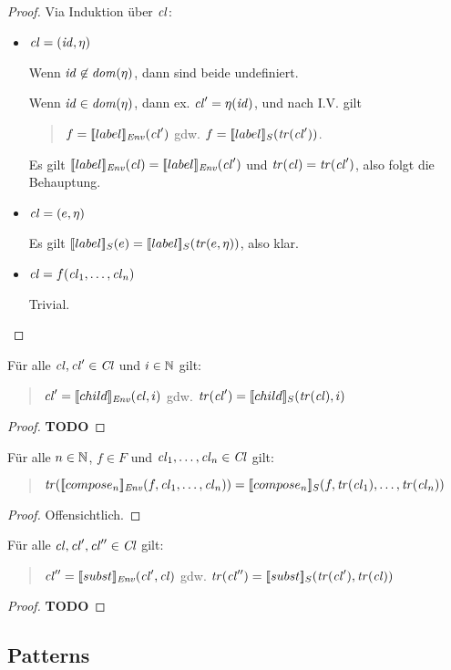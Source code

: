\documentclass[12pt,a4paper,draft]{article}
\begin{document}
\begin{proof}
  Via Induktion \"uber $\mathit{cl}$:
  \begin{itemize}
  \item $\mathit{cl} = (\mathit{id},\eta)$

    Wenn $\mathit{id} \not\in \mathit{dom}(\eta)$, dann sind beide undefiniert.

    Wenn $\mathit{id} \in \mathit{dom}(\eta)$, dann ex. $\mathit{cl}' = \eta(\mathit{id})$, und nach I.V. gilt
    \begin{quote}
      $f = [\![label]\!]_{\mathit{Env}}(\mathit{cl}')$ gdw. $f = [\![label]\!]_S(\mathit{tr}(\mathit{cl}'))$.
    \end{quote}
    Es gilt $[\![label]\!]_{\mathit{Env}}(\mathit{cl}) = [\![label]\!]_{\mathit{Env}}(\mathit{cl}')$ und
    $\mathit{tr}(\mathit{cl}) = \mathit{tr}(\mathit{cl}')$, also folgt die Behauptung.

  \item $\mathit{cl} = (e,\eta)$

    Es gilt $[\![label]\!]_S(e) = [\![label]\!]_S(\mathit{tr}(e,\eta))$, also klar.

  \item $\mathit{cl} = f(\mathit{cl}_1,\ldots,\mathit{cl}_n)$

    Trivial.

  \end{itemize}
\end{proof}

\begin{lemma}
  F\"ur alle $\mathit{cl},\mathit{cl}' \in \mathit{Cl}$ und $i \in \mathbb N$ gilt:
  \begin{quote}
    $\mathit{cl}' = [\![child]\!]_{\mathit{Env}}(\mathit{cl},i)$ gdw. $\mathit{tr}(\mathit{cl}') = [\![child]\!]_S(\mathit{tr}(\mathit{cl}),i)$
  \end{quote}
\end{lemma}

\begin{proof}
  \textbf{TODO}
\end{proof}

\begin{lemma}
  F\"ur alle $n \in \mathbb N$, $f \in F$ und $\mathit{cl}_1,\ldots,\mathit{cl}_n \in \mathit{Cl}$ gilt:
  \begin{quote}
    $\mathit{tr}([\![compose_n]\!]_{\mathit{Env}}(f,\mathit{cl}_1,\ldots,\mathit{cl}_n)) = [\![compose_n]\!]_S(f,\mathit{tr}(\mathit{cl}_1),\ldots,\mathit{tr}(\mathit{cl}_n))$
  \end{quote}
\end{lemma}

\begin{proof}
  Offensichtlich.
\end{proof}

\begin{lemma}
  F\"ur alle $\mathit{cl},\mathit{cl}',\mathit{cl}''\in\mathit{Cl}$ gilt:
  \begin{quote}
    $\mathit{cl}'' = [\![subst]\!]_{\mathit{Env}}(\mathit{cl}',\mathit{cl})$ gdw. $\mathit{tr}(\mathit{cl}'') = [\![subst]\!]_S(\mathit{tr}(\mathit{cl}'),\mathit{tr}(\mathit{cl}))$
  \end{quote}
\end{lemma}

\begin{proof}
  \textbf{TODO}
\end{proof}


\subsection*{Patterns}
\end{document}
